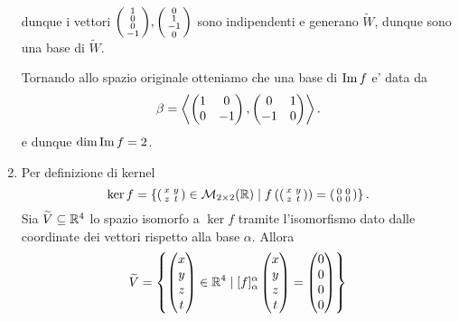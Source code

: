 \begin{solution}
\begin{enumerate}
\begin{gather*}
        \end{gather*}
        dunque i vettori $\begin{psmallmatrix} 1 \\ 0 \\ 0 \\ -1 \end{psmallmatrix}, \begin{psmallmatrix} 0 \\ 1 \\ -1 \\ 0 \end{psmallmatrix}$ sono indipendenti e generano $\widetilde{W}$, dunque sono una base di $\widetilde{W}$.

        Tornando allo spazio originale otteniamo che una base di $\operatorname{Im}f$ e' data da \[
            \beta = \left\langle \begin{pmatrix} 1 & 0 \\ 0 & -1 \end{pmatrix}, \begin{pmatrix} 0 & 1 \\ -1 & 0 \end{pmatrix} \right\rangle.
        \] e dunque $\dim \operatorname{Im}f = 2$.
        \item Per definizione di kernel \[
            \ker f = \left\{ \begin{psmallmatrix}x&y\\z&t \end{psmallmatrix}\in \mathcal{M}_{2\times 2}(\mathbb{R}) \mid f\left(\begin{psmallmatrix}x&y\\z&t \end{psmallmatrix}\right) = \begin{psmallmatrix}0&0\\0&0 \end{psmallmatrix}\right\}.
        \] Sia $\widetilde{V} \subseteq \mathbb{R}^4$ lo spazio isomorfo a $\ker f$ tramite l'isomorfismo dato dalle coordinate dei vettori rispetto alla base $\alpha$. Allora \begin{alignat*}{1}
            \widetilde{V} &= \left\{ \begin{pmatrix}x\\y\\z\\t \end{pmatrix}\in \R^4 \mid [f]^{\alpha}_{\alpha}\begin{pmatrix}x\\y\\z\\t \end{pmatrix} = \begin{pmatrix}0\\0\\0\\0 \end{pmatrix}\right\} \\

\end{alignat*}
\end{enumerate}
\end{solution}
